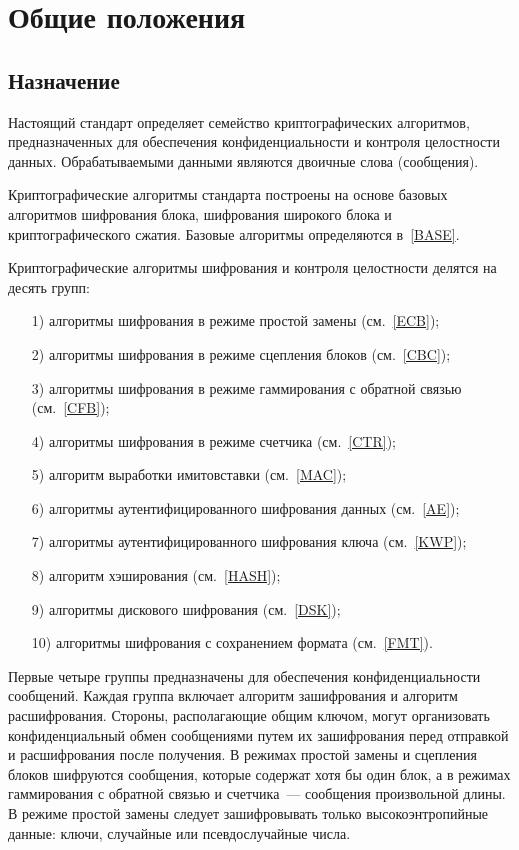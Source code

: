 \chapter{Общие положения}\label{COMMON}

\section{Назначение}

Настоящий стандарт определяет семейство криптографических алгоритмов,
предназначенных для обеспечения конфиденциальности и контроля 
целостности данных. Обрабатываемыми данными являются двоичные слова 
(сообщения). 

Криптографические алгоритмы стандарта построены на основе 
базовых алгоритмов шифрования блока, 
шифрования широкого блока и криптографического сжатия.
Базовые алгоритмы определяются в~\ref{BASE}.

Криптографические алгоритмы шифрования и контроля целостности
делятся на десять групп:
\begin{enumerate}
\item[1)]
алгоритмы шифрования в режиме простой замены (см.~\ref{ECB});
\item[2)]
алгоритмы шифрования в режиме сцепления блоков (см.~\ref{CBC});
\item[3)]
алгоритмы шифрования в режиме гаммирования с обратной связью (см.~\ref{CFB});
\item[4)]
алгоритмы шифрования в режиме счетчика (см.~\ref{CTR});
\item[5)]
алгоритм выработки имитовставки (см.~\ref{MAC});
\item[6)]
алгоритмы аутентифицированного шифрования данных (см.~\ref{AE});
\item[7)]
алгоритмы аутентифицированного шифрования ключа (см.~\ref{KWP});
\item[8)]
алгоритм хэширования (см.~\ref{HASH});
\item[9)]
алгоритмы дискового шифрования (см.~\ref{DSK});
\item[10)]
алгоритмы шифрования с сохранением формата (см.~\ref{FMT}).
\end{enumerate}

Первые четыре группы предназначены для обеспечения конфиденциальности сообщений. 
Каждая группа включает алгоритм зашифрования и алгоритм расшифрования.
Стороны, располагающие общим ключом, могут организовать 
конфиденциальный обмен сообщениями путем их зашифрования 
перед отправкой и расшифрования после получения.
%
В режимах простой замены и сцепления блоков шифруются сообщения,
которые содержат хотя бы один блок, 
а в режимах гаммирования с обратной связью и счетчика~--- 
сообщения произвольной длины.
%
В режиме простой замены следует зашифровывать только 
высокоэнтропийные данные: ключи, случайные или псевдослучайные числа.


